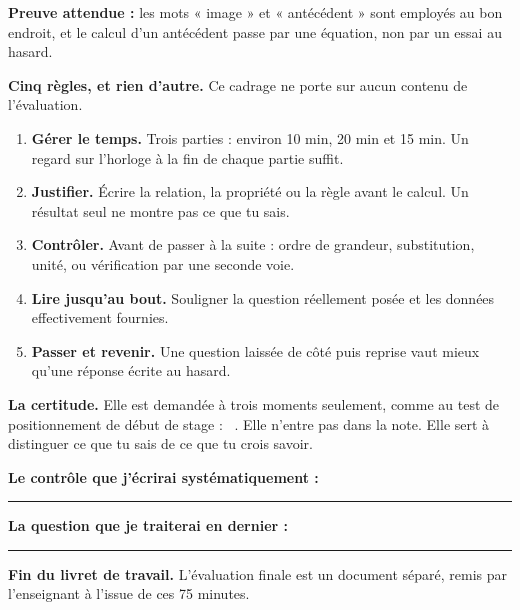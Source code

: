 \documentclass[10pt,a4paper]{article}
\begin{document}
\begin{successbox}
\textbf{Preuve attendue :} les mots « image » et « antécédent » sont employés au bon endroit, et le calcul
d'un antécédent passe par une équation, non par un essai au hasard.
\end{successbox}

\needspace{62mm}\par\vspace{3mm}

\begin{methodbox}
\textbf{Cinq règles, et rien d'autre.} Ce cadrage ne porte sur aucun contenu de l'évaluation.
\begin{enumerate}
\item \textbf{Gérer le temps.} Trois parties : environ 10 min, 20 min et 15 min. Un regard sur l'horloge à la fin de chaque partie suffit.
\item \textbf{Justifier.} Écrire la relation, la propriété ou la règle avant le calcul. Un résultat seul ne montre pas ce que tu sais.
\item \textbf{Contrôler.} Avant de passer à la suite : ordre de grandeur, substitution, unité, ou vérification par une seconde voie.
\item \textbf{Lire jusqu'au bout.} Souligner la question réellement posée et les données effectivement fournies.
\item \textbf{Passer et revenir.} Une question laissée de côté puis reprise vaut mieux qu'une réponse écrite au hasard.
\end{enumerate}
\end{methodbox}

\begin{graybox}
\textbf{La certitude.} Elle est demandée à trois moments seulement, comme au test de positionnement de début de stage :
\conf\ . Elle n'entre pas dans la note. Elle sert à distinguer ce que tu sais de ce que tu crois savoir.
\end{graybox}

\par\vspace{1mm}
\noindent\textbf{Le contrôle que j'écrirai systématiquement :}\ \rule{\dimexpr\linewidth-76mm\relax}{0.32pt}
\par\vspace{3mm}
\noindent\textbf{La question que je traiterai en dernier :}\ \rule{\dimexpr\linewidth-68mm\relax}{0.32pt}
\par\vspace{1mm}

\begin{warningbox}\textbf{Fin du livret de travail.} L'évaluation finale est un document séparé, remis par l'enseignant à l'issue de ces 75 minutes.\end{warningbox}
\end{document}
